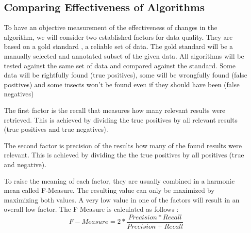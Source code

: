 \subsection{Comparing Effectiveness of Algorithms}
To have an objective measurement of the effectiveness of changes in the algorithm, we will consider two established factors for data quality.
They are based on a gold standard \cite{gold_standard}, a reliable set of data.
The gold standard will be a manually selected and annotated subset of the given data. 
All algorithms will be tested against the same set of data and compared against the standard.
Some data will be rightfully found (true positives), some will be wrongfully found (false positives) and some insects won't be found even if they should have been (false negatives)

The first factor is the recall that measures how many relevant results were retrieved. 
This is achieved by dividing the true positives by all relevant results (true positives and true negatives).

The second factor is precision of the results how many of the found results were relevant. 
This is achieved by dividing the the true positives by all positives (true and negative).

To raise the meaning of each factor, they are usually combined in a harmonic mean called F-Measure. 
The resulting value can only be maximized by maximizing both values. 
A very low value in one of the factors will result in an overall low factor. 
The F-Measure is calculated as follows \cite{f_measure}: 
\[
F-Measure = 2*\frac{Precision*Recall}{Precision+Recall}
\]

